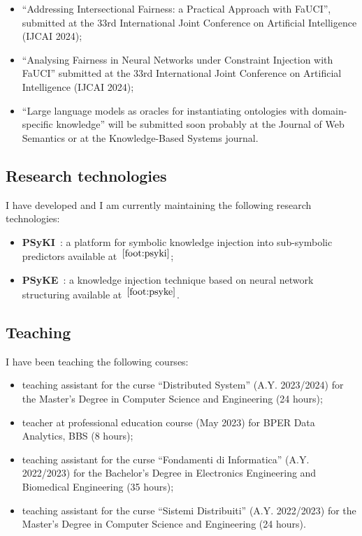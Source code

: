 \documentclass[]{scrartcl}
\begin{document}
    \begin{itemize}
        \item ``Addressing Intersectional Fairness: a Practical Approach with FaUCI'', submitted at the 33rd International Joint Conference on Artificial Intelligence (IJCAI 2024);
        \item ``Analysing Fairness in Neural Networks under Constraint Injection with FaUCI'' submitted at the 33rd International Joint Conference on Artificial Intelligence (IJCAI 2024);
        \item ``Large language models as oracles for instantiating ontologies with domain-specific knowledge'' will be submitted soon probably at the Journal of Web Semantics or at the Knowledge-Based Systems journal.
    \end{itemize}

    \subsection{Research technologies}
    \label{sec:done:technologies}
    I have developed and I am currently maintaining the following research technologies:
    \begin{itemize}
        \item \textbf{PSyKI}~\cite{psyki-extraamas2022}: a platform for symbolic knowledge injection into sub-symbolic predictors available at~$^{\ref{foot:psyki}}$;
        \item \textbf{PSyKE}~\cite{psyke-woa2021}: a knowledge injection technique based on neural network structuring available at~$^{\ref{foot:psyke}}$.
    \end{itemize}

    \subsection{Teaching}
    \label{sec:done:teaching}
    I have been teaching the following courses:
    \begin{itemize}
        \item teaching assistant for the curse ``Distributed System'' (A.Y. 2023/2024) for the Master's Degree in Computer Science and Engineering (24 hours);
        \item teacher at professional education course (May 2023) for BPER Data Analytics, BBS (8 hours);
        \item teaching assistant for the curse ``Fondamenti di Informatica'' (A.Y. 2022/2023) for the Bachelor's Degree in Electronics Engineering and Biomedical Engineering (35 hours);
        \item teaching assistant for the curse ``Sistemi Distribuiti'' (A.Y. 2022/2023) for the Master's Degree in Computer Science and Engineering (24 hours).
    \end{itemize}
\end{document}
